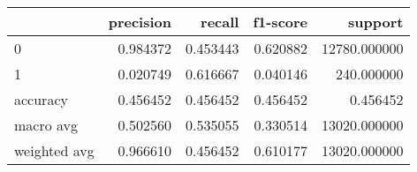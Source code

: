 \begin{tabular}{lrrrr}
\toprule
{} &  precision &    recall &  f1-score &       support \\
\midrule
0            &   0.984372 &  0.453443 &  0.620882 &  12780.000000 \\
1            &   0.020749 &  0.616667 &  0.040146 &    240.000000 \\
accuracy     &   0.456452 &  0.456452 &  0.456452 &      0.456452 \\
macro avg    &   0.502560 &  0.535055 &  0.330514 &  13020.000000 \\
weighted avg &   0.966610 &  0.456452 &  0.610177 &  13020.000000 \\
\bottomrule
\end{tabular}
